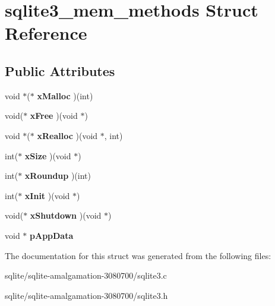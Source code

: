 \hypertarget{structsqlite3__mem__methods}{\section{sqlite3\+\_\+mem\+\_\+methods Struct Reference}
\label{structsqlite3__mem__methods}
}
\subsection*{Public Attributes}
\begin{DoxyCompactItemize}
\item 
\hypertarget{structsqlite3__mem__methods_acb9151cf501c851b61ab6b378832b159}{void $\ast$($\ast$ {\bfseries x\+Malloc} )(int)}\label{structsqlite3__mem__methods_acb9151cf501c851b61ab6b378832b159}

\item 
\hypertarget{structsqlite3__mem__methods_aa2e7fe8d030adaa17fd23a44fec1eca1}{void($\ast$ {\bfseries x\+Free} )(void $\ast$)}\label{structsqlite3__mem__methods_aa2e7fe8d030adaa17fd23a44fec1eca1}

\item 
\hypertarget{structsqlite3__mem__methods_a5bb7e62164d0934888473c618c61dc77}{void $\ast$($\ast$ {\bfseries x\+Realloc} )(void $\ast$, int)}\label{structsqlite3__mem__methods_a5bb7e62164d0934888473c618c61dc77}

\item 
\hypertarget{structsqlite3__mem__methods_a6c68275b577d66ae659ef30344c8f86c}{int($\ast$ {\bfseries x\+Size} )(void $\ast$)}\label{structsqlite3__mem__methods_a6c68275b577d66ae659ef30344c8f86c}

\item 
\hypertarget{structsqlite3__mem__methods_a8b3f0d1ddeb498c4aaf9bbce5b92a268}{int($\ast$ {\bfseries x\+Roundup} )(int)}\label{structsqlite3__mem__methods_a8b3f0d1ddeb498c4aaf9bbce5b92a268}

\item 
\hypertarget{structsqlite3__mem__methods_ad0997b548928358d655000b6ac825cf4}{int($\ast$ {\bfseries x\+Init} )(void $\ast$)}\label{structsqlite3__mem__methods_ad0997b548928358d655000b6ac825cf4}

\item 
\hypertarget{structsqlite3__mem__methods_a6f48100692bd935d7f3dbb8c701ab6ca}{void($\ast$ {\bfseries x\+Shutdown} )(void $\ast$)}\label{structsqlite3__mem__methods_a6f48100692bd935d7f3dbb8c701ab6ca}

\item 
\hypertarget{structsqlite3__mem__methods_af91b7adfa1f6aace0b129bac800bd444}{void $\ast$ {\bfseries p\+App\+Data}}\label{structsqlite3__mem__methods_af91b7adfa1f6aace0b129bac800bd444}

\end{DoxyCompactItemize}


The documentation for this struct was generated from the following files\+:\begin{DoxyCompactItemize}
\item 
sqlite/sqlite-\/amalgamation-\/3080700/sqlite3.\+c\item 
sqlite/sqlite-\/amalgamation-\/3080700/sqlite3.\+h\end{DoxyCompactItemize}
